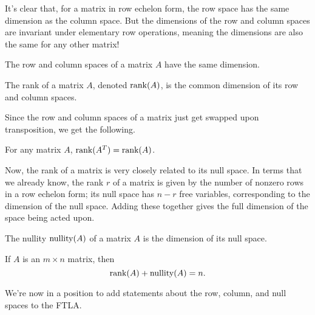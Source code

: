 \documentclass[../m073main.tex]{subfiles}
\begin{document}
It's clear that, for a matrix in row echelon form, the row space has the same dimension as the column space.
But the dimensions of the row and column spaces are invariant under elementary row operations, meaning the dimensions are also the same for any other matrix!

\begin{theorem}
	The row and column spaces of a matrix $A$ have the same dimension.
\end{theorem}

\begin{definition}[Rank]
	The rank of a matrix $A$, denoted $\textrm{rank}(A)$, is the common dimension of its row and column spaces.
\end{definition}

Since the row and column spaces of a matrix just get swapped upon transposition, we get the following.

\begin{theorem}
	For any matrix $A$, $\textrm{rank}(A^T) = \textrm{rank}(A)$.
\end{theorem}

Now, the rank of a matrix is very closely related to its null space.
In terms that we already know, the rank $r$ of a matrix is given by the number of nonzero rows in a row echelon form; its null space has $n-r$ free variables, corresponding to the dimension of the null space.
Adding these together gives the full dimension of the space being acted upon.

\begin{definition}[Nullity]
	The nullity $\textrm{nullity}(A)$ of a matrix $A$ is the dimension of its null space.
\end{definition}

\begin{theorem}
	If $A$ is an $m\times n$ matrix, then
	\[ \textrm{rank}(A) + \textrm{nullity}(A) = n. \]
\end{theorem}

We're now in a position to add statements about the row, column, and null spaces to the FTLA.

\pagebreak
\end{document}
